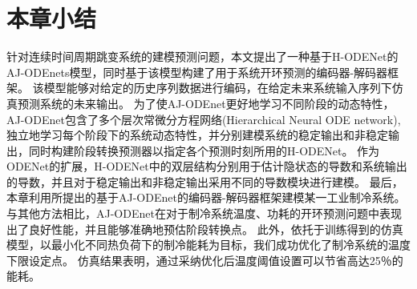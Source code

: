 \section{本章小结}
\label{sec:conclusion}
针对连续时间周期跳变系统的建模预测问题，本文提出了一种基于H-ODENet的AJ-ODEnets模型，同时基于该模型构建了用于系统开环预测的编码器-解码器框架。
该模型能够对给定的历史序列数据进行编码，在给定未来系统输入序列下仿真预测系统的未来输出。
为了使AJ-ODEnet更好地学习不同阶段的动态特性，AJ-ODEnet包含了多个层次常微分方程网络(Hierarchical Neural ODE network), 独立地学习每个阶段下的系统动态特性，并分别建模系统的稳定输出和非稳定输出，同时构建阶段转换预测器以指定各个预测时刻所用的H-ODENet。
作为ODENet的扩展，H-ODENet中的双层结构分别用于估计隐状态的导数和系统输出的导数，并且对于稳定输出和非稳定输出采用不同的导数模块进行建模。
最后，本章利用所提出的基于AJ-ODEnet的编码器-解码器框架建模某一工业制冷系统。与其他方法相比，AJ-ODEnet在对于制冷系统温度、功耗的开环预测问题中表现出了良好性能，并且能够准确地预估阶段转换点。
此外，依托于训练得到的仿真模型，以最小化不同热负荷下的制冷能耗为目标，我们成功优化了制冷系统的温度下限设定点。
仿真结果表明，通过采纳优化后温度阈值设置可以节省高达25％的能耗。







